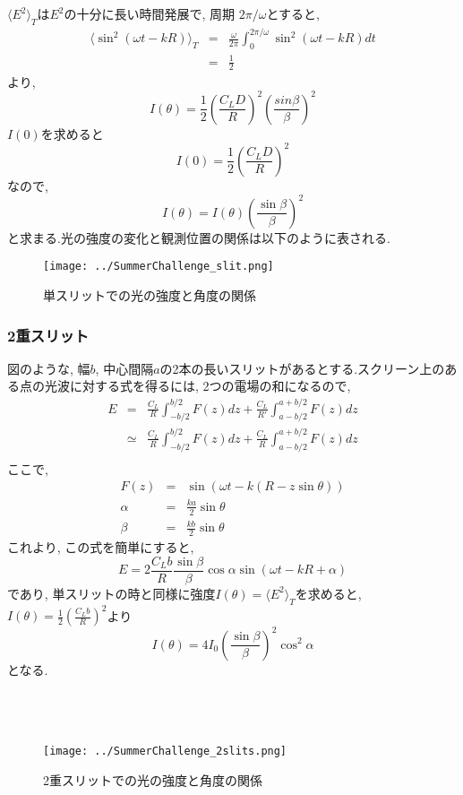 $\langle E^2\rangle_T$は$E^2$の十分に長い時間発展で, 周期 $2\pi / \omega$とすると, 
\begin{eqnarray*}
  \langle \sin^2(\omega t - kR)\rangle_T  &=& \frac{\omega}{2\pi} \int_{0}^{2\pi / \omega} \sin^2(\omega t - kR) dt \\
  &=& \frac{1}{2}
\end{eqnarray*}
より, 
\[
  I(\theta) = \frac{1}{2} \left(\frac{C_L D}{R}\right)^2 \left(\frac{sin \beta}{\beta}\right)^2
\]
$I(0)$を求めると
\[
  I(0) = \frac{1}{2} \left(\frac{C_L D}{R}\right)^2
\]
なので, 
\[
  I(\theta) = I(\theta) \left(\frac{\sin \beta}{\beta}\right)^2
\]
と求まる.光の強度の変化と観測位置の関係は以下のように表される.\\

\begin{figure}[h]
  \begin{center}
    \texttt{[image: ../SummerChallenge\_slit.png]}
    \caption{単スリットでの光の強度と角度の関係}
  \end{center}
\end{figure}

\clearpage

\subsubsection{2重スリット}
図のような, 幅$b$, 中心間隔$a$の2本の長いスリットがあるとする.スクリーン上のある点の光波に対する式を得るには, 2つの電場の和になるので, 
\begin{eqnarray*}
  E &=& \frac{C_L}{R} \int_{-b/2}^{b/2} F(z) dz + \frac{C_L}{R'} \int_{a-b/2}^{a+b/2} F(z) dz \\
  &\simeq& \frac{C_L}{R} \int_{-b/2}^{b/2} F(z) dz + \frac{C_L}{R} \int_{a-b/2}^{a+b/2} F(z) dz \\
\end{eqnarray*}
ここで, 
\begin{eqnarray*}
  F(z) &=& \sin(\omega t - k(R-z\sin\theta)) \\
  \alpha &=& \frac{ka}{2} \sin\theta \\
  \beta &=& \frac{kb}{2} \sin\theta
\end{eqnarray*}
これより, この式を簡単にすると, 
\[
  E = 2 \frac{C_L b}{R} \frac{\sin\beta}{\beta} \cos\alpha \sin(\omega t -kR + \alpha)
\]
であり, 単スリットの時と同様に強度$I(\theta) = \langle E^2\rangle_T$を求めると, $I(\theta) = \frac{1}{2} (\frac{C_L b}{R})^2$より
\[
  I(\theta) = 4I_0 \left(\frac{\sin \beta}{\beta}\right)^2 \cos^2 \alpha
\]
となる.\\
\\
\\
\\
\begin{figure}[h]
  \begin{center}
    \texttt{[image: ../SummerChallenge\_2slits.png]}
    \caption{2重スリットでの光の強度と角度の関係}
  \end{center}
\end{figure}

